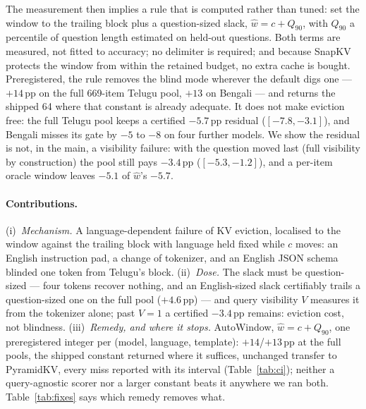 \documentclass{article}
\begin{document}
The measurement then implies a rule that is computed rather than tuned:
set the window to the trailing block plus a question-sized slack,
$\hat w = c + Q_{90}$, with $Q_{90}$ a percentile of question length
estimated on held-out questions. Both terms are measured, not fitted to
accuracy; no delimiter is required; and because SnapKV protects the
window from within the retained budget, no extra cache is bought.
Preregistered, the rule removes the blind mode wherever the default
digs one --- $+14$\,pp on the full 669-item Telugu pool, $+13$ on
Bengali --- and returns the shipped 64 where that constant is already
adequate. It does not make eviction free: the full Telugu pool keeps a
certified $-5.7$\,pp residual ($[-7.8,-3.1]$), and Bengali misses its
gate by $-5$ to $-8$ on four further models. We show the residual is
not, in the main, a visibility failure: with the question moved last
(full visibility by construction) the pool still pays $-3.4$\,pp
($[-5.3,-1.2]$), and a per-item oracle window leaves $-5.1$ of
$\hat w$'s $-5.7$.

\paragraph{Contributions.}
(i)~\emph{Mechanism.} A language-dependent failure of KV eviction,
localised to the window against the trailing block with language held
fixed while $c$ moves: an English instruction pad, a change of
tokenizer, and an English JSON schema blinded one token from Telugu's
block.
(ii)~\emph{Dose.} The slack must be question-sized --- four tokens
recover nothing, and an English-sized slack certifiably trails a
question-sized one on the full pool ($+4.6$\,pp) --- and query
visibility $V$ measures it from the tokenizer alone; past $V{=}1$ a
certified $-3.4$\,pp remains: eviction cost, not blindness.
(iii)~\emph{Remedy, and where it stops.} AutoWindow, $\hat w = c +
Q_{90}$, one preregistered integer per (model, language, template):
$+14$/$+13$\,pp at the full pools, the shipped constant returned where
it suffices, unchanged transfer to PyramidKV, every miss reported with
its interval (Table~\ref{tab:ci}); neither a query-agnostic scorer
nor a larger constant beats it anywhere we ran both.
Table~\ref{tab:fixes} says which remedy removes what.
\end{document}
